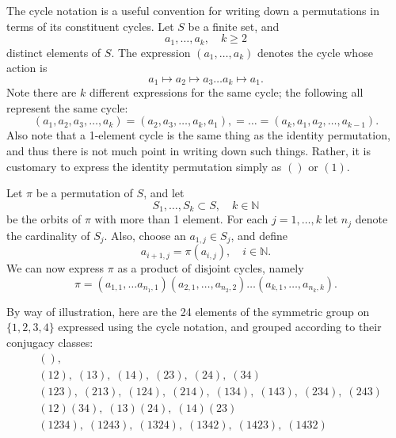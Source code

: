 \documentclass[12pt]{article}
\newcommand{\natnums}{\mathbb{N}}
\begin{document}
The cycle notation is a useful convention for writing down a
permutations in terms of its constituent cycles.  Let $S$ be a finite
set, and
$$a_1,\ldots,a_k,\quad k\geq 2$$
distinct elements of $S$.  The
expression $(a_1,\ldots,a_k)$ denotes the cycle whose action is
$$a_1\mapsto a_2\mapsto a_3\ldots a_k \mapsto a_1.$$
Note there are $k$ different expressions for the same cycle; the
following all represent the same cycle:
$$(a_1,a_2,a_3,\ldots,a_k) = (a_2,a_3,\ldots,a_k,a_1),=\ldots =
(a_k,a_1,a_2,\ldots,a_{k-1}).$$
Also note that a 1-element cycle is
the same thing as the identity permutation, and thus there is not
much point in writing down such things.  Rather, it is customary to
express the identity permutation simply as $()$ or $(1)$.

Let $\pi$ be a permutation of $S$, and let 
$$S_1,\ldots, S_k\subset S,\quad k\in\natnums$$
be the orbits of $\pi$
with more than 1 element.  For each $j=1,\ldots,k$ let $n_j$ denote
the cardinality of $S_j$.  Also, choose an $a_{1,j}\in S_j$, and
define
$$a_{i+1,j} = \pi(a_{i,j}),\quad i\in\natnums.$$
We can now express $\pi$ as a product of disjoint cycles, namely
$$\pi = (a_{1,1},\ldots a_{n_1,1}) (a_{2,1},\ldots,a_{n_2,2}) \ldots
(a_{k,1},\ldots,a_{n_k,k}).$$

By way of illustration, here are the 24 elements of the symmetric
group on $\{1,2,3,4\}$ expressed using the cycle notation, and grouped
according to their conjugacy classes:
\begin{align*}
&(),\\
&(12), \;(13),\; (14),\; (23),\; (24),\; (34)\\
&(123),\; (213),\; (124),\; (214),\; (134),\; (143),\; (234),\;
(243)\\
&(12)(34),\;(13)(24),\; (14)(23)\\
&(1234),\; (1243),\; (1324),\; (1342),\; (1423),\; (1432)
\end{align*}
\end{document}
